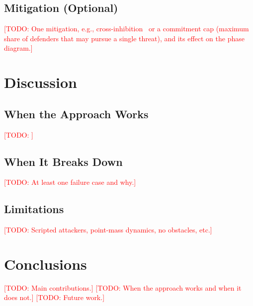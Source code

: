 \documentclass[conference]{IEEEtran}
\newcommand{\todo}[1]{\textcolor{red}{[TODO: #1]}}
\begin{document}
\subsection{Mitigation (Optional)}
\todo{One mitigation, e.g., cross-inhibition~\cite{seeley2012stop} or a commitment cap (maximum share of defenders that may pursue a single threat), and its effect on the phase diagram.}

\section{Discussion}
\label{sec:discussion}
\subsection{When the Approach Works}
\todo{}
\subsection{When It Breaks Down}
\todo{At least one failure case and why.}
\subsection{Limitations}
\todo{Scripted attackers, point-mass dynamics, no obstacles, etc.}

\section{Conclusions}
\label{sec:conclusion}
\todo{Main contributions.}
\todo{When the approach works and when it does not.}
\todo{Future work.}



\end{document}
